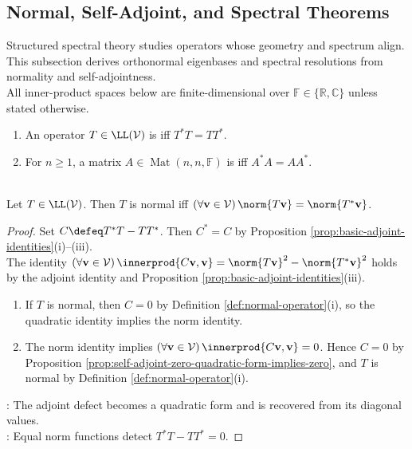 \subsection{Normal, Self-Adjoint, and Spectral Theorems}

%

Structured spectral theory studies operators whose geometry and spectrum align.\\
This subsection derives orthonormal eigenbases and spectral resolutions from normality and self-adjointness.\\
All inner-product spaces below are finite-dimensional over $\mathbb{F}\in\{\mathbb{R},\mathbb{C}\}$ unless stated otherwise.

\begin{definition} \label{def:normal-operator} 
\begin{enumerate}[label=(\roman*)]
\setlength{\itemsep}{0pt}
\item An operator $T\in\LL(\mathcal{V})$ is  iff $T^*T=TT^*$.
\item For $n\geq1$, a matrix $A\in\operatorname{Mat}(n,n,\mathbb{F})$ is  iff $A^*A=AA^*$.
\end{enumerate}
\end{definition}

\begin{theorem} \label{thm:normal-iff-equal-adjoint-norms} \\
Let $T\in\LL(\mathcal{V})$. Then $T$ is normal iff $(\forall\mathbf{v}\in\mathcal{V})\,\norm{T\mathbf{v}}=\norm{T^*\mathbf{v}}$.
\begin{proof}
Set $C\defeq T^*T-TT^*$. Then $C^*=C$ by Proposition \ref{prop:basic-adjoint-identities}(i)--(iii).\\
The identity $(\forall\mathbf{v}\in\mathcal{V})\,\innerprod{C\mathbf{v},\mathbf{v}}=\norm{T\mathbf{v}}^2-\norm{T^*\mathbf{v}}^2$ holds by the adjoint identity and Proposition \ref{prop:basic-adjoint-identities}(iii).
\begin{enumerate}[label=\roman*.]
\setlength{\itemsep}{0pt}
\item[$(\Rightarrow)$] If $T$ is normal, then $C=0$ by Definition \ref{def:normal-operator}(i), so the quadratic identity implies the norm identity.
\item[$(\Leftarrow)$] The norm identity implies $(\forall\mathbf{v}\in\mathcal{V})\,\innerprod{C\mathbf{v},\mathbf{v}}=0$. Hence $C=0$ by Proposition \ref{prop:self-adjoint-zero-quadratic-form-implies-zero}, and $T$ is normal by Definition \ref{def:normal-operator}(i).
\end{enumerate}
: The adjoint defect becomes a quadratic form and is recovered from its diagonal values.\\
: Equal norm functions detect $T^*T-TT^*=0$.
\end{proof}
\end{theorem}

